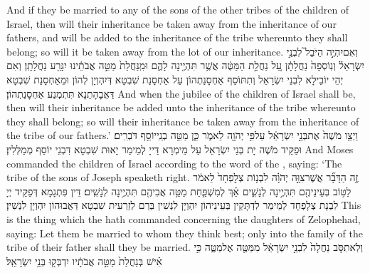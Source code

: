 {And if they be married to any of the sons of the other tribes of the children of Israel, then will their inheritance be taken away from the inheritance of our fathers, and will be added to the inheritance of the tribe whereunto they shall belong; so will it be taken away from the lot of our inheritance.}{}
{וְאִם\maqqaf יִהְיֶ֣ה הַיֹּבֵל֮ לִבְנֵ֣י יִשְׂרָאֵל֒ וְנֽוֹסְפָה֙ נַחֲלָתָ֔ן עַ֚ל נַחֲלַ֣ת הַמַּטֶּ֔ה אֲשֶׁ֥ר תִּהְיֶ֖ינָה לָהֶ֑ם וּמִֽנַּחֲלַת֙ מַטֵּ֣ה אֲבֹתֵ֔ינוּ יִגָּרַ֖ע נַחֲלָתָֽן׃}
{וְאִם יְהֵי יוֹבֵילָא לִבְנֵי יִשְׂרָאֵל וְתִתּוֹסַף אַחְסָנַתְהוֹן עַל אַחְסָנַת שִׁבְטָא דְּיִהְוְיָן לְהוֹן וּמֵאַחְסָנַת שִׁבְטָא דַּאֲבָהָתַנָא תִּתְמְנַע אַחְסָנַתְהוֹן׃}
{And when the jubilee of the children of Israel shall be, then will their inheritance be added unto the inheritance of the tribe whereunto they shall belong; so will their inheritance be taken away from the inheritance of the tribe of our fathers.’}{}
{וַיְצַ֤ו מֹשֶׁה֙ אֶת\maqqaf בְּנֵ֣י יִשְׂרָאֵ֔ל עַל\maqqaf פִּ֥י יְהֹוָ֖ה לֵאמֹ֑ר כֵּ֛ן מַטֵּ֥ה בְנֵֽי\maqqaf יוֹסֵ֖ף דֹּבְרִֽים׃}
{וּפַקֵּיד מֹשֶׁה יָת בְּנֵי יִשְׂרָאֵל עַל מֵימְרָא דַּייָ לְמֵימַר יָאוּת שִׁבְטָא דִּבְנֵי יוֹסֵף מְמַלְּלִין׃}
{And Moses commanded the children of Israel according to the word of the \lord, saying: ‘The tribe of the sons of Joseph speaketh right.}{}
{זֶ֣ה הַדָּבָ֞ר אֲשֶׁר\maqqaf צִוָּ֣ה יְהֹוָ֗ה לִבְנ֤וֹת צְלׇפְחָד֙ לֵאמֹ֔ר לַטּ֥וֹב בְּעֵינֵיהֶ֖ם תִּהְיֶ֣ינָה לְנָשִׁ֑ים אַ֗ךְ לְמִשְׁפַּ֛חַת מַטֵּ֥ה אֲבִיהֶ֖ם תִּהְיֶ֥ינָה לְנָשִֽׁים׃}
{דֵּין פִּתְגָמָא דְּפַקֵּיד יְיָ לִבְנָת צְלָפְחָד לְמֵימַר לִדְתָּקֵין בְּעֵינֵיהוֹן יִהְוְיָן לִנְשִׁין בְּרַם לְזַרְעִית שִׁבְטָא דַּאֲבוּהוֹן יִהְוְיָן לִנְשִׁין׃}
{This is the thing which the \lord\space hath commanded concerning the daughters of Zelophehad, saying: Let them be married to whom they think best; only into the family of the tribe of their father shall they be married.}{}
{וְלֹֽא\maqqaf תִסֹּ֤ב נַחֲלָה֙ לִבְנֵ֣י יִשְׂרָאֵ֔ל מִמַּטֶּ֖ה אֶל\maqqaf מַטֶּ֑ה כִּ֣י אִ֗ישׁ בְּנַחֲלַת֙ מַטֵּ֣ה אֲבֹתָ֔יו יִדְבְּק֖וּ בְּנֵ֥י יִשְׂרָאֵֽל׃}
